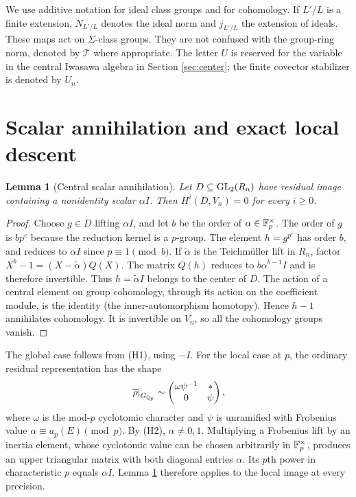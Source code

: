 \documentclass[11pt,a4paper]{article}
\newtheorem{lemma}[theorem]{Lemma}
\theoremstyle{definition}\newtheorem{definition}[theorem]{Definition}
\theoremstyle{remark}\newtheorem{remark}[theorem]{Remark}
\numberwithin{equation}{section}
\begin{document}
We use additive notation for ideal class groups and for cohomology. If $L'/L$ is a finite extension, $N_{L'/L}$ denotes the ideal norm and $j_{L'/L}$ the extension of ideals. These maps act on $\Sigma$-class groups. They are not confused with the group-ring norm, denoted by $\mathcal T$ where appropriate. The letter $U$ is reserved for the variable in the central Iwasawa algebra in Section \ref{sec:center}; the finite covector stabilizer is denoted by $U_n$.


\section{Scalar annihilation and exact local descent}
\begin{lemma}[Central scalar annihilation]\label{lem:scalar}
Let $D\subseteq\operatorname{GL}_2(R_n)$ have residual image containing a nonidentity scalar $\alpha I$. Then $H^i(D,V_n)=0$ for every $i\ge0$.
\end{lemma}
\begin{proof}
Choose $g\in D$ lifting $\alpha I$, and let $b$ be the order of $\alpha\in\mathbb F_p^\times$. The order of $g$ is $bp^c$ because the reduction kernel is a $p$-group. The element $h=g^{p^c}$ has order $b$, and reduces to $\alpha I$ since $p\equiv1\pmod b$. If $\widetilde\alpha$ is the Teichm\"uller lift in $R_n$, factor $X^b-1=(X-\widetilde\alpha)Q(X)$. The matrix $Q(h)$ reduces to $b\alpha^{b-1}I$ and is therefore invertible. Thus $h=\widetilde\alpha I$ belongs to the center of $D$. The action of a central element on group cohomology, through its action on the coefficient module, is the identity (the inner-automorphism homotopy). Hence $h-1$ annihilates cohomology. It is invertible on $V_n$, so all the cohomology groups vanish.
\end{proof}
The global case follows from (H1), using $-I$. For the local case at $p$, the ordinary residual representation has the shape
\[
\left.\overline\rho\right|_{G_{\mathbb Q_p}}\sim
\begin{pmatrix}\omega\psi^{-1}&*\\0&\psi\end{pmatrix},
\]
where $\omega$ is the mod-$p$ cyclotomic character and $\psi$ is unramified with Frobenius value $\alpha\equiv a_p(E)\pmod p$. By (H2), $\alpha\ne0,1$. Multiplying a Frobenius lift by an inertia element, whose cyclotomic value can be chosen arbitrarily in $\mathbb F_p^\times$, produces an upper triangular matrix with both diagonal entries $\alpha$. Its $p$th power in characteristic $p$ equals $\alpha I$. Lemma \ref{lem:scalar} therefore applies to the local image at every precision.
\end{document}
